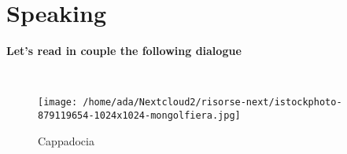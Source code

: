 \documentclass[]{article} %
\begin{document}
	
	
	
	\section*{Speaking}
	
	
	
	\begin{minipage}[h]{0.95\textwidth}
		
		\begin{question}
			\textbf{Let's read in couple the following dialogue}
		\end{question}
		
		
		\
		\begin{wrapfigure}{r}{0.4\textwidth}
			\raggedleft
			\texttt{[image: /home/ada/Nextcloud2/risorse-next/istockphoto-879119654-1024x1024-mongolfiera.jpg]}
			\caption {Cappadocia}
		\end{wrapfigure}
		
		
		

\end{minipage}
\end{document}
